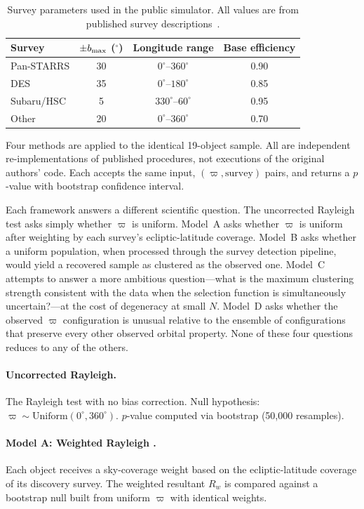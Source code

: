 \documentclass[usenatbib]{mnras}
\begin{document}
\begin{table}[htbp]
\centering
\caption{Survey parameters used in the public simulator. All values are from published survey descriptions~\protect\citep{shankman2017,brown2019,napier2021}.}
\label{tab:surveys}
\footnotesize
\begin{tabular}{lccc}
\hline
Survey & $\pm b_{\rm max}$ ($^\circ$) & Longitude range & Base efficiency \\
\hline
Pan-STARRS & 30 & $0^\circ$--$360^\circ$ & 0.90 \\
DES        & 35 & $0^\circ$--$180^\circ$ & 0.85 \\
Subaru/HSC &  5 & $330^\circ$--$60^\circ$ & 0.95 \\
Other      & 20 & $0^\circ$--$360^\circ$ & 0.70 \\
\hline
\end{tabular}
\end{table}

Four methods are applied to the identical 19-object sample. All are independent re-implementations of published procedures, not executions of the original authors' code. Each accepts the same input, $(\varpi, \mathrm{survey})$ pairs, and returns a $p$-value with bootstrap confidence interval.

Each framework answers a different scientific question. The uncorrected Rayleigh test asks simply whether $\varpi$ is uniform. Model~A asks whether $\varpi$ is uniform after weighting by each survey's ecliptic-latitude coverage. Model~B asks whether a uniform population, when processed through the survey detection pipeline, would yield a recovered sample as clustered as the observed one. Model~C attempts to answer a more ambitious question---what is the maximum clustering strength consistent with the data when the selection function is simultaneously uncertain?---at the cost of degeneracy at small $N$. Model~D asks whether the observed $\varpi$ configuration is unusual relative to the ensemble of configurations that preserve every other observed orbital property. None of these four questions reduces to any of the others.

\paragraph{Uncorrected Rayleigh.}
The Rayleigh test with no bias correction. Null hypothesis: $\varpi \sim \mathrm{Uniform}(0^\circ, 360^\circ)$. $p$-value computed via bootstrap (50,000 resamples).

\paragraph{Model A: Weighted Rayleigh \protect\citep{brown2019}.}
Each object receives a sky-coverage weight based on the ecliptic-latitude coverage of its discovery survey. The weighted resultant $R_w$ is compared against a bootstrap null built from uniform $\varpi$ with identical weights.
\end{document}
